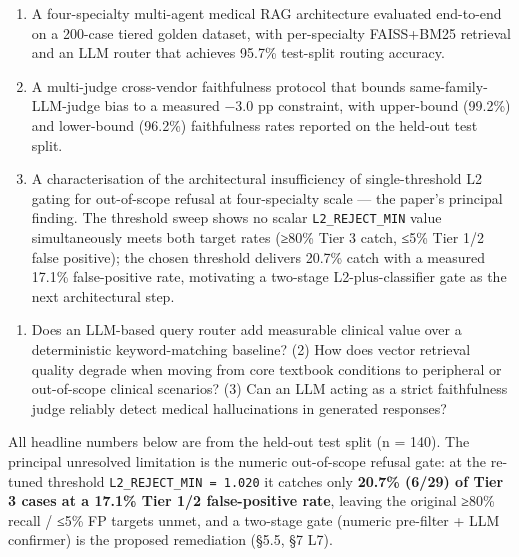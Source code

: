 \documentclass[
  american,
  a4paper,
]{article}
\providecommand{\tightlist}{%
  \setlength{\itemsep}{0pt}\setlength{\parskip}{0pt}}
\begin{document}
\begin{enumerate}
\def\labelenumi{\arabic{enumi}.}
\item
  A four-specialty multi-agent medical RAG architecture evaluated
  end-to-end on a 200-case tiered golden dataset, with per-specialty
  FAISS+BM25 retrieval and an LLM router that achieves 95.7\% test-split
  routing accuracy.
\item
  A multi-judge cross-vendor faithfulness protocol that bounds
  same-family-LLM-judge bias to a measured −3.0 pp constraint, with
  upper-bound (99.2\%) and lower-bound (96.2\%) faithfulness rates
  reported on the held-out test split.
\item
  A characterisation of the architectural insufficiency of
  single-threshold L2 gating for out-of-scope refusal at four-specialty
  scale --- the paper's principal finding. The threshold sweep shows no
  scalar \texttt{L2\_REJECT\_MIN} value simultaneously meets both target
  rates (≥80\% Tier 3 catch, ≤5\% Tier 1/2 false positive); the chosen
  threshold delivers 20.7\% catch with a measured 17.1\% false-positive
  rate, motivating a two-stage L2-plus-classifier gate as the next
  architectural step.
\end{enumerate}

\begin{enumerate}
\def\labelenumi{(\arabic{enumi})}
\tightlist
\item
  Does an LLM-based query router add measurable clinical value over a
  deterministic keyword-matching baseline? (2) How does vector retrieval
  quality degrade when moving from core textbook conditions to
  peripheral or out-of-scope clinical scenarios? (3) Can an LLM acting
  as a strict faithfulness judge reliably detect medical hallucinations
  in generated responses?
\end{enumerate}

All headline numbers below are from the held-out test split (n = 140).
The principal unresolved limitation is the numeric out-of-scope refusal
gate: at the re-tuned threshold \texttt{L2\_REJECT\_MIN\ =\ 1.020} it
catches only \textbf{20.7\% (6/29) of Tier 3 cases at a 17.1\% Tier 1/2
false-positive rate}, leaving the original ≥80\% recall / ≤5\% FP
targets unmet, and a two-stage gate (numeric pre-filter + LLM confirmer)
is the proposed remediation (§5.5, §7 L7).
\end{document}
